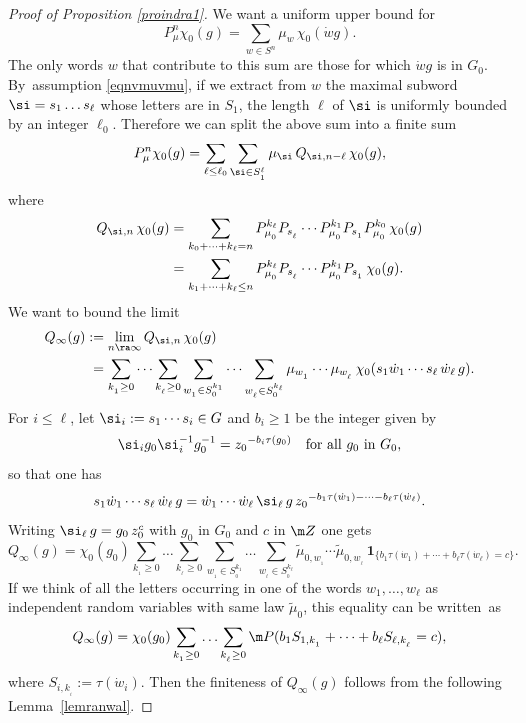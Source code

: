 \begin{proof}[Proof of Proposition \ref{proindra1}]
We want a uniform upper bound for
\[
P^n_\mu\chi_0(g)
=
\sum_{w\in S^n}\mu_w\,\chi_0(\dot{w}g).
\]
The only words $w$ that contribute to this sum are those for which
$\dot{w}g$ is in $G_0$.
By~assumption \eqref{eqnvmuvmu},
if we extract from $w$ the maximal subword $\si=s_1\ldots s_\ell$
whose letters are in $S_1$, the length $\ell$ of $\si$ is uniformly bounded
by an integer $\ell_0$.
Therefore we can split the above sum into a finite sum
\[
P^n_\mu\chi_0(g)
=
\sum_{\ell\leq \ell_0}\sum_{\si\in S_{_1}^\ell}
\mu_\si\,Q_{\si,n-\ell}\,\chi_0(g),
\]
where
\begin{equation}
\label{eqnqsinch}
\begin{aligned}
Q_{\si,n}\,\chi_0(g)
&=
\sum_{k_0+\cdots +k_\ell=n}
P^{k_\ell}_{\mu_{_0}}P_{s_{_\ell}}\cdots
P^{k_1}_{\mu_{_0}}P_{s_{_1}}P^{k_0}_{\mu_{_0}}\,\chi_0(g)\\
&=
\sum_{k_1+\cdots +k_\ell\leq n}
P^{k_\ell}_{\mu_{_0}}P_{s_{_\ell}}\cdots
P^{k_1}_{\mu_{_0}}P_{s_{_1}}\,\chi_0(g).
\end{aligned}
\end{equation}
We want to bound the limit
\begin{equation}
\label{eqnqsiinf}
\begin{aligned}
Q_\infty(g)
&:=
\lim_{n\ra\infty}
Q_{\si,n}\,\chi_0(g)\\
&\hphantom{:}=
\sum_{k_{_1}\geq 0}\cdots\sum_{k_{_\ell}\geq 0}
\sum_{w_{_1}\in S^{k_1}_{_0}}\cdots\sum_{w_{_\ell}\in S^{k_\ell}_{_0}}
\mu_{w_{_1}}\cdots\mu_{w_{_\ell}}\,\chi_0(s_1\dot{w}_{1}\cdots s_\ell\, \dot{w}_{\ell}\, g).
\end{aligned}
\end{equation}
For $i\leq \ell$, let $\si_i:=s_1\cdots s_i\in G$ and $b_i\geq 1$ be the integer given by
\[
\si_ig_0\si_i^{-1}g_0^{-1}={z_0}^{-b_i\tau(g_0)}
\quad\text{for all $g_0$ in $G_0$,}
\]
so that one has
\begin{equation}
\label{eqnswswg}
s_1\dot{w}_{1}\cdots s_\ell\, \dot{w}_{\ell}\, g
=
\dot{w}_{1}\cdots \dot{w}_{\ell}\,\si_\ell\, g\, {z_0}^{-b_1\tau(\dot{w}_1)-\cdots -b_\ell\tau(\dot{w}_\ell)}.
\end{equation}
Writing $\si_\ell\, g=g_0\,z_0^{c}$ with $g_0$ in $G_0$ and $c$ in $\m Z$
one gets
\[
Q_\infty(g)
=\chi_0(g_0)\sum_{k_{_1}\geq 0}\ldots\sum_{k_{_\ell}\geq 0}
\sum_{w_{_1}\in S^{k_1}_{_0}}\ldots\sum_{w_{_\ell}\in S^{k_\ell}_{_0}}
\widetilde{\mu}_{0,w_{_1}}\cdots\widetilde{\mu}_{0,w_{_\ell}}\,
\mathbf{1}_{\{b_1\tau(\dot{w}_1)+\cdots +b_\ell\tau(\dot{w}_\ell)=c\}}.
\]
If we think of all the letters occurring in one of the words $w_1,\ldots, w_\ell$
as independent random variables with same law $\widetilde{\mu}_0$,
this equality can be written~as
\[
\label{eqnqinf3}
Q_\infty(g)
=\chi_0(g_0)
\sum_{k_{_1}\geq 0}\ldots\sum_{k_{_\ell}\geq 0}
\m P(b_1S_{1,k_{_1}}+\cdots +b_\ell S_{\ell,k_{_\ell}}=c),
\]
where $S_{i,k_{_i}}:=\tau(\dot{w}_i)$.
Then the finiteness of $Q_\infty(g)$ follows from the following
Lemma~\ref{lemranwal}.
\end{proof}

